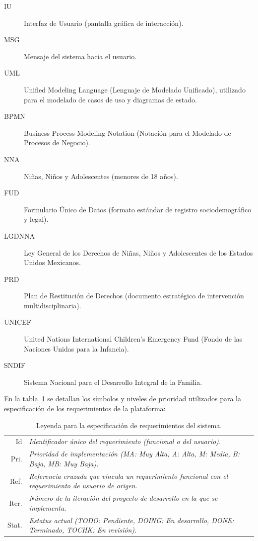 \begin{description}
	\item[IU] Interfaz de Usuario (pantalla gráfica de interacción).
	\item[MSG] Mensaje del sistema hacia el usuario.
	\item[UML] Unified Modeling Language (Lenguaje de Modelado Unificado), utilizado para el modelado de casos de uso y diagramas de estado.
	\item[BPMN] Business Process Modeling Notation (Notación para el Modelado de Procesos de Negocio).
	\item[NNA] Niñas, Niños y Adolescentes (menores de 18 años).
	\item[FUD] Formulario Único de Datos (formato estándar de registro sociodemográfico y legal).
	\item[LGDNNA] Ley General de los Derechos de Niñas, Niños y Adolescentes de los Estados Unidos Mexicanos.
	\item[PRD] Plan de Restitución de Derechos (documento estratégico de intervención multidisciplinaria).
	\item[UNICEF] United Nations International Children's Emergency Fund (Fondo de las Naciones Unidas para la Infancia).
	\item[SNDIF] Sistema Nacional para el Desarrollo Integral de la Familia.
\end{description}

En la tabla~\ref{tbl:leyendaRF} se detallan los símbolos y niveles de prioridad utilizados para la especificación de los requerimientos de la plataforma:

\begin{table}[hbtp!]
	\begin{center}
    \begin{tabular}{|r l|}
	    \hline
    	{\footnotesize Id} & {\footnotesize\em Identificador único del requerimiento (funcional o del usuario).}\\
    	{\footnotesize Pri.} & {\footnotesize\em Prioridad de implementación (MA: Muy Alta, A: Alta, M: Media, B: Baja, MB: Muy Baja).}\\
    	{\footnotesize Ref.} & {\footnotesize\em Referencia cruzada que vincula un requerimiento funcional con el requerimiento de usuario de origen.}\\
    	{\footnotesize Iter.} & {\footnotesize\em Número de la iteración del proyecto de desarrollo en la que se implementa.}\\
    	{\footnotesize Stat.} & {\footnotesize\em Estatus actual (TODO: Pendiente, DOING: En desarrollo, DONE: Terminado, TOCHK: En revisión).}\\
		\hline
    \end{tabular} 
    \caption{Leyenda para la especificación de requerimientos del sistema.}
    \label{tbl:leyendaRF}
	\end{center}
\end{table}